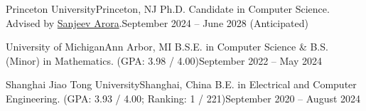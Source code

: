 \documentclass[a4paper,11pt]{article}
\begin{document}
\normalsize{
\resumeSubHeadingListStart

\resumeSubheading
{Princeton University}{Princeton, NJ}
{Ph.D. Candidate in Computer Science. Advised by \href{https://www.cs.princeton.edu/~arora/}{Sanjeev Arora}.}{September 2024 -- June 2028 (Anticipated)}

\resumeSubheading
{University of Michigan}{Ann Arbor, MI}
{B.S.E. in Computer Science \& B.S. (Minor) in Mathematics. (GPA: 3.98 / 4.00)}{September 2022 -- May 2024}

\resumeSubheading
{Shanghai Jiao Tong University}{Shanghai, China}
{B.E. in Electrical and Computer Engineering. (GPA: 3.93 / 4.00; Ranking: 1 / 221)}{September 2020 -- August 2024}

\resumeSubHeadingListEnd
}

\vspace{-6mm}

\end{document}
